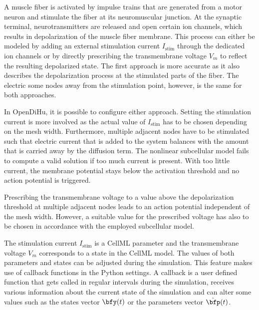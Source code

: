 A muscle fiber is activated by impulse trains that are generated from a motor neuron and stimulate the fiber at its neuromuscular junction. At the synaptic terminal, neurotransmitters are released and open certain ion channels, which results in depolarization of the muscle fiber membrane.
This process can either be modeled by adding an external stimulation current $I_\text{stim}$ through the dedicated ion channels or by directly prescribing the transmembrane voltage $V_m$ to reflect the resulting depolarized state. The first approach is more accurate as it also describes the depolarization process at the stimulated parts of the fiber. The electric  some nodes away from the stimulation point, however, is the same for both approaches.

In OpenDiHu, it is possible to configure either approach. Setting the stimulation current is more involved as the actual value of  $I_\text{stim}$ has to be chosen depending on the mesh width. Furthermore, multiple adjacent nodes have to be stimulated such that electric current that is added to the system balances with the amount that is carried away by the diffusion term. The nonlinear subcellular model fails to compute a valid solution if too much current is present. With too little current, the membrane potential stays below the activation threshold and no action potential is triggered. 

Prescribing the transmembrane voltage to a value above the depolarization threshold at multiple adjacent nodes leads to an action potential independent of the mesh width. However, a suitable value for the prescribed voltage has also to be chosen in accordance with the employed subcellular model.

The stimulation current $I_\text{stim}$ is a CellML parameter and the transmembrane voltage $V_m$ corresponds to a state in the CellML model. The values of both parameters and states can be adjusted during the simulation. This feature makes use of callback functions in the Python settings. A callback is a user defined function that gets called in regular intervals during the simulation, receives various information about the current state of the simulation and can alter some values such as the states vector $\bfy(t)$ or the parameters vector $\hat{\bfp}(t)$.

